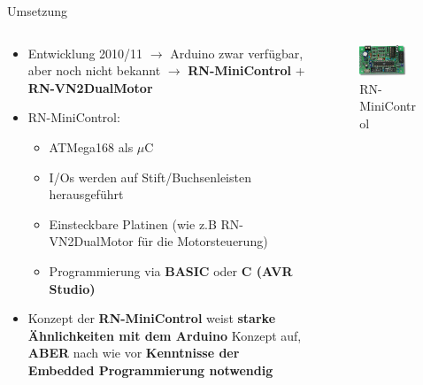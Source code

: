\documentclass{beamer}
\begin{document}
\begin{frame}{Umsetzung}
\begin{columns}
	\begin{column}{0.7\textwidth}
\begin{itemize}
	\item Entwicklung 2010/11 $\rightarrow$ Arduino zwar verf\"ugbar, aber noch nicht bekannt $\rightarrow$ \textbf{RN-MiniControl} + \textbf{RN-VN2DualMotor}
\end{itemize}
\begin{itemize}
	\item RN-MiniControl:
	\begin{itemize}
		\item ATMega168 als $\mu$C
		\item I/Os werden auf Stift/Buchsenleisten herausgef\"uhrt
		\item Einsteckbare Platinen (wie z.B RN-VN2DualMotor f\"ur die Motorsteuerung)
		\item Programmierung via \textbf{BASIC} oder \textbf{C (AVR Studio)}
	\end{itemize}
\end{itemize}
\begin{itemize}
	\item Konzept der \textbf{RN-MiniControl} weist \textbf{starke \"Ahnlichkeiten mit dem Arduino} Konzept auf, \textbf{ABER} nach wie vor \textbf{Kenntnisse der Embedded Programmierung notwendig}
\end{itemize}
	\end{column}
	\begin{column}{0.3\textwidth}
	\begin{figure}
		\centering
		\includegraphics[width=0.8\textwidth]{./images/rn-minicontrol.jpg}
		\caption{RN-MiniControl\cite{Image:RNMiniControl}}
	\end{figure}
	\begin{figure}

\end{figure}
\end{column}
\end{columns}
\end{frame}
\end{document}
